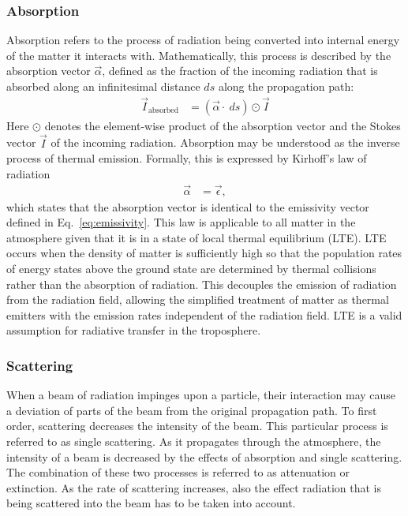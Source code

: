 \subsubsection{Absorption}

Absorption refers to the process of radiation being converted into internal
energy of the matter it interacts with. Mathematically, this process is
described by the absorption vector $\vec{\alpha}$, defined as the fraction of
the incoming radiation that is absorbed along an infinitesimal distance $ds$
along the propagation path:
\begin{align}
\vec{I}_\text{absorbed} &= (\vec{\alpha} \cdot\ ds) \odot \vec{I}
\end{align}
Here $\odot$ denotes the element-wise product of the absorption vector and
the Stokes vector $\vec{I}$ of the incoming radiation. Absorption may be
understood as the inverse process of thermal emission. Formally, this is
expressed by Kirhoff's  law of radiation
\begin{align}
  \vec{\alpha} &= \vec{\epsilon},
\end{align}
which states that the absorption vector is identical to the emissivity
vector defined in Eq.~\ref{eq:emissivity}.
This law is applicable to all matter in the atmosphere given that it is in a
state of local thermal equilibrium (LTE). LTE occurs when the density of matter
is sufficiently high so that the population rates of energy states above the
ground state are determined by thermal collisions rather than the absorption of
radiation. This decouples the emission of radiation from the radiation field,
allowing the simplified treatment of matter as thermal emitters with the
emission rates independent of the radiation field. LTE is a valid assumption for
radiative transfer in the troposphere.

\subsubsection{Scattering}

When a beam of radiation impinges upon a particle, their interaction may cause a
deviation of parts of the beam from the original propagation path. To first
order, scattering decreases the intensity of the beam. This particular process
is referred to as single scattering. As it propagates through the atmosphere,
the intensity of a beam is decreased by the effects of absorption and single
scattering. The combination of these two processes is referred to as attenuation
or extinction. As the rate of scattering increases, also the effect radiation
that is being scattered into the beam has to be taken into account.

